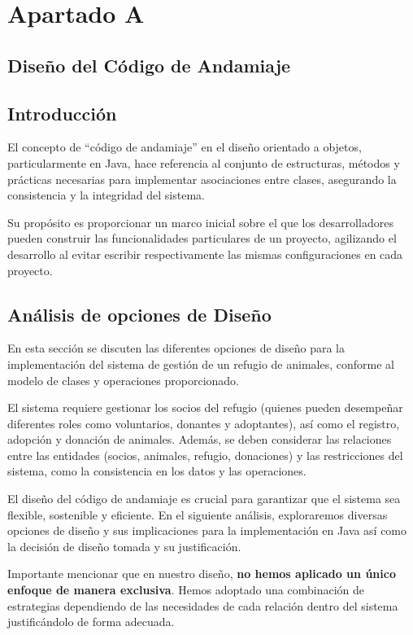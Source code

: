 \section{Apartado A}
\subsection{Diseño del Código de Andamiaje}
\subsection*{Introducción}
El concepto de \enquote{código de andamiaje} en el diseño orientado a objetos, 
particularmente en Java, hace referencia al conjunto de estructuras, métodos y 
prácticas necesarias para implementar asociaciones entre clases, asegurando la 
consistencia y la integridad del sistema.\par
\vspace{0.15cm}
Su propósito es proporcionar un marco inicial sobre el que los desarrolladores pueden 
construir las funcionalidades particulares de un proyecto, agilizando el desarrollo al 
evitar escribir respectivamente las mismas configuraciones en cada proyecto.

\subsection{Análisis de opciones de Diseño}
En esta sección se discuten las diferentes opciones de diseño para la implementación 
del sistema de gestión de un refugio de animales, conforme al modelo de clases y 
operaciones proporcionado.\par
\vspace{0.15cm}
El sistema requiere gestionar los socios del refugio (quienes pueden desempeñar 
diferentes roles como voluntarios, donantes y adoptantes), así como el registro, 
adopción y donación de animales. Además, se deben considerar las relaciones entre 
las entidades (socios, animales, refugio, donaciones) y las restricciones del sistema, 
como la consistencia en los datos y las operaciones.\par
\vspace{0.15cm}
El diseño del código de andamiaje es crucial para garantizar que el sistema sea flexible, 
sostenible y eficiente. En el siguiente análisis, exploraremos diversas opciones de diseño 
y sus implicaciones para la implementación en Java así como la decisión de diseño tomada y 
su justificación.\par
\vspace{0.15cm}
Importante mencionar que en nuestro diseño, \textbf{no hemos aplicado un único enfoque de manera 
exclusiva}. Hemos adoptado una combinación de estrategias dependiendo de las necesidades de 
cada relación dentro del sistema justificándolo de forma adecuada.


